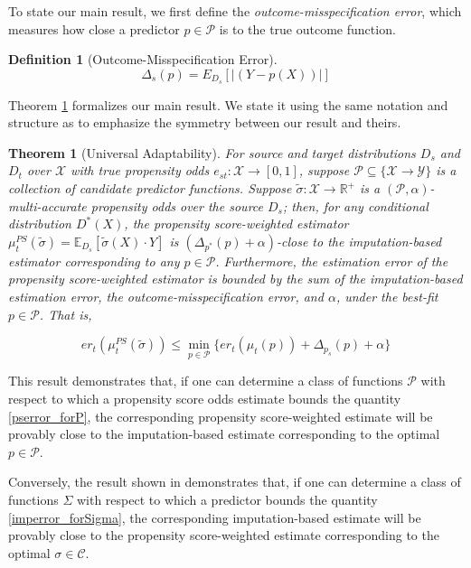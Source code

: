 \documentclass{article} %
\newtheorem{theorem}{Theorem}
\newtheorem{definition}{Definition}
\begin{document}
To state our main result, we first define the \emph{outcome-misspecification error}, which measures how close a predictor $p \in \mathcal{P}$ is to the true outcome function.

\begin{definition}[Outcome-Misspecification Error]
\begin{equation*}
    \Delta_s(p) = E_{D_s}[|(Y - p(X))|]
\end{equation*}
\end{definition}

Theorem \ref{theorem1} formalizes our main result. We state it using the same notation and structure as \cite{kim2022universal} to emphasize the symmetry between our result and theirs.

\begin{theorem}[Universal Adaptability]
\label{theorem1}
    For source and target distributions $D_s$ and $D_t$ over $\mathcal{X}$ with true propensity odds $e_{st}: \mathcal{X} \to [0,1]$, suppose $\mathcal{P} \subseteq \{\mathcal{X}\to \mathcal{Y}\}$ is a collection of candidate predictor functions. Suppose $\tilde{\sigma} : \mathcal{X} \to \mathbb{R}^+$ is a $(\mathcal{P}, \alpha)$-multi-accurate propensity odds over the source $D_s$; then, for any conditional distribution $D^*(X)$, 
    the propensity score-weighted estimator $\mu_t^{PS}(\tilde{\sigma}) = \mathbb{E}_{D_s}[\tilde{\sigma}(X)\cdot Y]$ is $(\Delta_{p^*}(p) + \alpha)$-close to the imputation-based estimator corresponding to any $p \in \mathcal{P}$. Furthermore, the estimation error of the propensity score-weighted estimator is bounded by the sum of the imputation-based estimation error, the outcome-misspecification error, and $\alpha$, under the best-fit $p \in \mathcal{P}$. That is, 
    
    \begin{equation*}
        er_t(\mu_t^{PS}(\tilde{\sigma})) \le \min_{p \in \mathcal{P}}\{er_t(\mu_t(p)) + \Delta_{p_s}(p) + \alpha\}
    \end{equation*}
\end{theorem}

This result demonstrates that, if one can determine a class of functions $\mathcal{P}$ with respect to which a propensity score odds estimate bounds the quantity \ref{pserror_forP}, the corresponding propensity score-weighted estimate will be provably close to the imputation-based estimate corresponding to the optimal $p \in \mathcal{P}$.

Conversely, the result shown in \cite{kim2022universal} demonstrates that, if one can determine a class of functions $\Sigma$ with respect to which a predictor bounds the quantity \ref{imperror_forSigma}, the corresponding imputation-based estimate will be provably close to the propensity score-weighted estimate corresponding to the optimal $\sigma \in \mathcal{C}$. 
\end{document}
